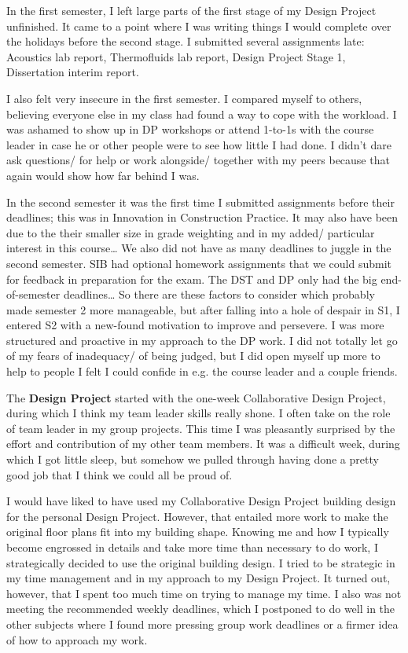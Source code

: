 In the first semester, I left large parts of the first stage of my Design Project unfinished.
It came to a point where I was writing things I would complete over the holidays before the second stage.
I submitted several assignments late: Acoustics lab report, Thermofluids lab report, Design Project Stage 1, Dissertation interim report.

I also felt very insecure in the first semester.
I compared myself to others, believing everyone else in my class had found a way to cope with the workload.
I was ashamed to show up in DP workshops or attend 1-to-1s with the course leader in case he or other people were to see how little I had done.
I didn't dare ask questions/ for help or work alongside/ together with my peers because that again would show how far behind I was.

In the second semester it was the first time I submitted assignments before their deadlines; this was in Innovation in Construction Practice.
It may also have been due to the their smaller size in grade weighting and in my added/ particular interest in this course…
We also did not have as many deadlines to juggle in the second semester.
SIB had optional homework assignments that we could submit for feedback in preparation for the exam.
The DST and DP only had the big end-of-semester deadlines…
So there are these factors to consider which probably made semester 2 more manageable, but after falling into a hole of despair in S1, I entered S2 with a new-found motivation to improve and persevere.
I was more structured and proactive in my approach to the DP work.
I did not totally let go of my fears of inadequacy/ of being judged, but I did open myself up more to help to people I felt I could confide in e.g. the course leader and a couple friends.

The \textbf{Design Project} started with the one-week Collaborative Design Project, during which I think my team leader skills really shone.
I often take on the role of team leader in my group projects.
This time I was pleasantly surprised by the effort and contribution of my other team members.
It was a difficult week, during which I got little sleep, but somehow we pulled through having done a pretty good job that I think we could all be proud of.

I would have liked to have used my Collaborative Design Project building design for the personal Design Project.
However, that entailed more work to make the original floor plans fit into my building shape.
Knowing me and how I typically become engrossed in details and take more time than necessary to do work, I strategically decided to use the original building design.
I tried to be strategic in my time management and in my approach to my Design Project.
It turned out, however, that I spent too much time on trying to manage my time.
I also was not meeting the recommended weekly deadlines, which I postponed to do well in the other subjects where I found more pressing group work deadlines or a firmer idea of how to approach my work.

